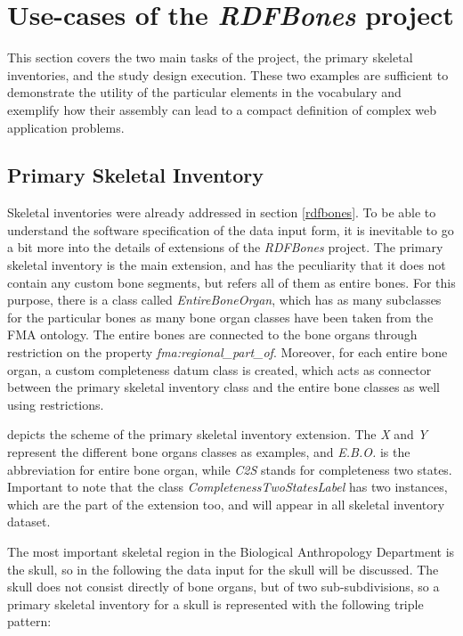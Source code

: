 
\section{Use-cases of the \textit{RDFBones} project}

This section covers the two main tasks of the project, the primary skeletal inventories, and the study design execution. These two examples are sufficient to demonstrate the utility of the particular elements in the vocabulary and exemplify how their assembly can lead to a compact definition of complex web application problems. 

\subsection{Primary Skeletal Inventory}

Skeletal inventories were already addressed in section \ref{rdfbones}. To be able to understand the software specification of the data input form, it is inevitable to go a bit more into the details of extensions of the \textit{RDFBones} project. The primary skeletal inventory is the main extension, and has the peculiarity that it does not contain any custom bone segments, but refers all of them as entire bones. For this purpose, there is a class called \textit{EntireBoneOrgan}, which has as many subclasses for the particular bones as many bone organ classes have been taken from the FMA ontology. The entire bones are connected to the bone organs through restriction on the property \textit{fma:regional\_part\_of}. Moreover, for each entire bone organ, a custom completeness datum class is created, which acts as connector between the primary skeletal inventory class and the entire bone classes as well using restrictions. 


 depicts the scheme of the primary skeletal inventory extension. The \textit{X} and \textit{Y} represent the different bone organs classes as examples, and \textit{E.B.O.} is the abbreviation for entire bone organ, while \textit{C2S} stands for completeness two states. Important to note that the class \textit{CompletenessTwoStatesLabel} has two instances, which are the part of the extension too, and will appear in all skeletal inventory dataset.

The most important skeletal region in the Biological Anthropology Department is the skull, so in the following the data input for the skull will be discussed. The skull does not consist directly of bone organs, but of two sub-subdivisions, so a primary skeletal inventory for a skull is represented with the following triple pattern: 

